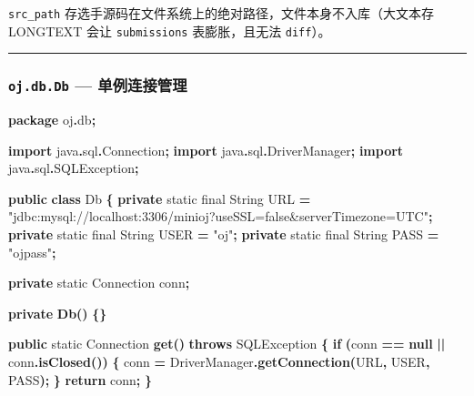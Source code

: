 \documentclass[
  11pt,
]{ctexart}
\newenvironment{Shaded}{\begin{snugshade}}{\end{snugshade}}
\newcommand{\BuiltInTok}[1]{#1}
\newcommand{\ControlFlowTok}[1]{\textcolor[rgb]{0.13,0.29,0.53}{\textbf{#1}}}
\newcommand{\DataTypeTok}[1]{\textcolor[rgb]{0.13,0.29,0.53}{#1}}
\newcommand{\FunctionTok}[1]{\textcolor[rgb]{0.13,0.29,0.53}{\textbf{#1}}}
\newcommand{\ImportTok}[1]{#1}
\newcommand{\KeywordTok}[1]{\textcolor[rgb]{0.13,0.29,0.53}{\textbf{#1}}}
\newcommand{\NormalTok}[1]{#1}
\newcommand{\OperatorTok}[1]{\textcolor[rgb]{0.81,0.36,0.00}{\textbf{#1}}}
\newcommand{\StringTok}[1]{\textcolor[rgb]{0.31,0.60,0.02}{#1}}
\begin{document}
\texttt{src\_path}
存选手源码在文件系统上的绝对路径，文件本身不入库（大文本存 LONGTEXT 会让
\texttt{submissions} 表膨胀，且无法 \texttt{diff}）。

\begin{center}\rule{0.5\linewidth}{0.5pt}\end{center}

\hypertarget{oj.db.db-ux5355ux4f8bux8fdeux63a5ux7ba1ux7406}{%
\subsubsection{\texorpdfstring{\texttt{oj.db.Db} ---
单例连接管理}{oj.db.Db --- 单例连接管理}}\label{oj.db.db-ux5355ux4f8bux8fdeux63a5ux7ba1ux7406}}

\begin{Shaded}
\begin{Highlighting}[]
\KeywordTok{package}\ImportTok{ oj}\OperatorTok{.}\ImportTok{db}\OperatorTok{;}

\KeywordTok{import} \ImportTok{java}\OperatorTok{.}\ImportTok{sql}\OperatorTok{.}\ImportTok{Connection}\OperatorTok{;}
\KeywordTok{import} \ImportTok{java}\OperatorTok{.}\ImportTok{sql}\OperatorTok{.}\ImportTok{DriverManager}\OperatorTok{;}
\KeywordTok{import} \ImportTok{java}\OperatorTok{.}\ImportTok{sql}\OperatorTok{.}\ImportTok{SQLException}\OperatorTok{;}

\KeywordTok{public} \KeywordTok{class}\NormalTok{ Db }\OperatorTok{\{}
    \KeywordTok{private} \DataTypeTok{static} \DataTypeTok{final} \BuiltInTok{String} \BuiltInTok{URL}  \OperatorTok{=} \StringTok{"jdbc:mysql://localhost:3306/minioj?useSSL=false\&serverTimezone=UTC"}\OperatorTok{;}
    \KeywordTok{private} \DataTypeTok{static} \DataTypeTok{final} \BuiltInTok{String}\NormalTok{ USER }\OperatorTok{=} \StringTok{"oj"}\OperatorTok{;}
    \KeywordTok{private} \DataTypeTok{static} \DataTypeTok{final} \BuiltInTok{String}\NormalTok{ PASS }\OperatorTok{=} \StringTok{"ojpass"}\OperatorTok{;}

    \KeywordTok{private} \DataTypeTok{static} \BuiltInTok{Connection}\NormalTok{ conn}\OperatorTok{;}

    \KeywordTok{private} \FunctionTok{Db}\OperatorTok{()} \OperatorTok{\{\}}

    \KeywordTok{public} \DataTypeTok{static} \BuiltInTok{Connection} \FunctionTok{get}\OperatorTok{()} \KeywordTok{throws} \BuiltInTok{SQLException} \OperatorTok{\{}
        \ControlFlowTok{if} \OperatorTok{(}\NormalTok{conn }\OperatorTok{==} \KeywordTok{null} \OperatorTok{||}\NormalTok{ conn}\OperatorTok{.}\FunctionTok{isClosed}\OperatorTok{())} \OperatorTok{\{}
\NormalTok{            conn }\OperatorTok{=} \BuiltInTok{DriverManager}\OperatorTok{.}\FunctionTok{getConnection}\OperatorTok{(}\BuiltInTok{URL}\OperatorTok{,}\NormalTok{ USER}\OperatorTok{,}\NormalTok{ PASS}\OperatorTok{);}
        \OperatorTok{\}}
        \ControlFlowTok{return}\NormalTok{ conn}\OperatorTok{;}
    \OperatorTok{\}}


\end{Highlighting}
\end{Shaded}
\end{document}
